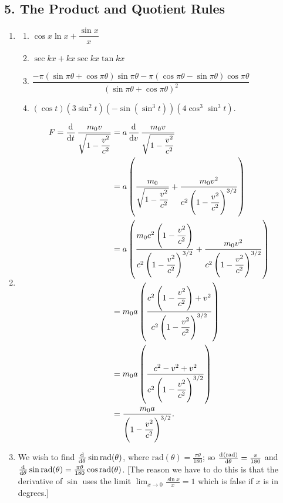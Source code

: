 \subsection*{5. The Product and Quotient Rules}
\begin{enumerate}
  \item
    \begin{enumerate}
      \item $ \cos x \ln x + \dfrac{\sin x}{x} $
      \item $ \sec kx + kx \sec kx \tan kx $
      \item $ \dfrac{-\pi(\sin \pi \theta + \cos \pi \theta)\sin \pi \theta - \pi(\cos \pi \theta - \sin \pi \theta) \cos \pi \theta}{(\sin \pi \theta + \cos \pi \theta)^2} $
      \item $ (\cos t)(3\sin^2 t)(-\sin(\sin^3 t))(4 \cos^3 \sin^3 t) $.
    \end{enumerate}
  \item
    \begin{align*}
      F = \dod{}{t} \frac{m_0 v}{\sqrt{1 - \dfrac{v^2}{c^2}}} &= a \dod{}{v} \frac{m_0 v}{\sqrt{1 - \dfrac{v^2}{c^2}}}\\
       &= a \left(\frac{m_0}{\sqrt{1 - \dfrac{v^2}{c^2}}} + \frac{m_0 v^2}{c^2\left(1 - \dfrac{v^2}{c^2}\right)^{3/2}} \right)\\
       &= a \left(\frac{m_0 c^2 \left(1 - \dfrac{v^2}{c^2}\right)}{c^2\left(1 - \dfrac{v^2}{c^2}\right)^{3/2}} + \frac{m_0 v^2}{c^2\left(1 - \dfrac{v^2}{c^2}\right)^{3/2}} \right)\\
       &= m_0 a \left(\frac{c^2 \left(1 - \dfrac{v^2}{c^2}\right) + v^2}{c^2\left(1 - \dfrac{v^2}{c^2}\right)^{3/2}} \right)\\
       &= m_0 a \left(\frac{c^2 - v^2 + v^2}{c^2\left(1 - \dfrac{v^2}{c^2}\right)^{3/2}} \right)\\
       &= \frac{m_0 a}{\left(1 - \dfrac{v^2}{c^2}\right)^{3/2}}.
    \end{align*}
  \item We wish to find $ \od{}{\theta} \sin{\mathrm{rad}(\theta)} $, where $ \mathrm{rad}(\theta) = \frac{\pi \theta}{180} $;
        so $ \od{(\mathrm{rad})}{\theta} = \frac{\pi}{180} $ and $ \od{}{\theta} \sin{\mathrm{rad}(\theta)} = \frac{\pi \theta}{180}\cos{\mathrm{rad}(\theta)} $. [The reason we have to do this is that the derivative of $ \sin $ uses the limit $ \lim_{x \to 0} \frac{\sin x}{x} = 1 $ which
        is false if $ x $ is in degrees.]
\end{enumerate}

